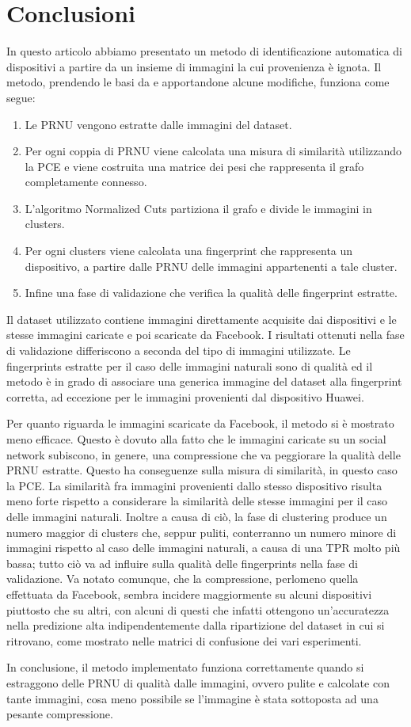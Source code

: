 \section{Conclusioni}

In questo articolo abbiamo presentato un metodo di identificazione automatica di dispositivi a partire da un insieme di immagini la cui provenienza è ignota. Il metodo, prendendo le basi da \cite{ Amerini2014831} e apportandone alcune modifiche, funziona come segue:
\begin{enumerate}
\item Le PRNU vengono estratte dalle immagini del dataset. 
\item Per ogni coppia di PRNU viene calcolata una misura di similarità utilizzando la PCE e viene costruita una matrice dei pesi che rappresenta il grafo completamente connesso.
\item L'algoritmo Normalized Cuts partiziona il grafo e divide le immagini in clusters.
\item Per ogni clusters viene calcolata una fingerprint che rappresenta un dispositivo, a partire dalle PRNU delle immagini appartenenti a tale cluster.
\item Infine una fase di validazione che verifica la qualità delle fingerprint estratte.
\end{enumerate}

Il dataset utilizzato contiene immagini direttamente acquisite dai dispositivi e le stesse immagini caricate e poi scaricate da Facebook. I risultati ottenuti nella fase di validazione differiscono a seconda del tipo di immagini utilizzate. Le fingerprints estratte per il caso delle immagini naturali sono di qualità ed il metodo è in grado di associare una generica immagine del dataset alla fingerprint corretta, ad eccezione per le immagini provenienti dal dispositivo Huawei.

Per quanto riguarda le immagini scaricate da Facebook, il metodo si è mostrato meno efficace. Questo è dovuto alla fatto che le immagini caricate su un social network subiscono, in genere, una compressione che va peggiorare la qualità delle PRNU estratte. Questo ha conseguenze sulla misura di similarità, in questo caso la PCE. La similarità fra immagini provenienti dallo stesso dispositivo risulta meno forte rispetto a considerare la similarità delle stesse immagini per il caso delle immagini naturali. Inoltre a causa di ciò, la fase di clustering produce un numero maggior di clusters che, seppur puliti, conterranno un numero minore di immagini rispetto al caso delle immagini naturali, a causa di una TPR molto più bassa; tutto ciò va ad influire sulla qualità delle fingerprints nella fase di validazione. Va notato comunque, che la compressione, perlomeno quella effettuata da Facebook, sembra incidere maggiormente su alcuni dispositivi piuttosto che su altri, con alcuni di questi che infatti ottengono un'accuratezza nella predizione alta indipendentemente dalla ripartizione del dataset in cui si ritrovano, come mostrato nelle matrici di confusione dei vari esperimenti.

In conclusione, il metodo implementato funziona correttamente quando si estraggono delle PRNU di qualità dalle immagini, ovvero pulite e calcolate con tante immagini, cosa meno possibile se l'immagine è stata sottoposta ad una pesante compressione.